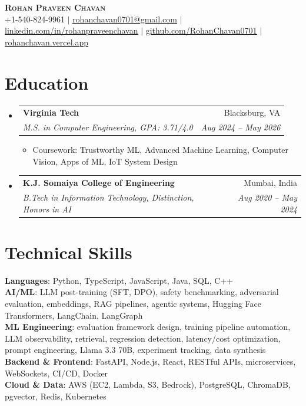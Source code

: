\documentclass[letterpaper,10pt]{article}
\makeatletter
\newcommand{\resumeItem}[1]{\item\small{#1 \vspace{-2.5pt}}}
\newcommand{\resumeSubheading}[4]{
  \vspace{-2pt}\item
    \begin{tabular*}{0.97\textwidth}[t]{l@{\extracolsep{\fill}}r}
      \textbf{#1} & #2 \\
      \textit{\small#3} & \textit{\small #4} \\
    \end{tabular*}\vspace{-7pt}
}
\newcommand{\resumeSubHeadingListStart}{\begin{itemize}[leftmargin=0.15in, label={}]}
\newcommand{\resumeSubHeadingListEnd}{\end{itemize}}
\newcommand{\resumeItemListStart}{\begin{itemize}}
\newcommand{\resumeItemListEnd}{\end{itemize}\vspace{-5pt}}
\makeatother
\begin{document}
\begin{center}
    \textbf{\Huge \scshape Rohan Praveen Chavan} \\ \vspace{2pt}
    \small +1-540-824-9961 $|$
    \href{mailto:rohanchavan0701@gmail.com}{\underline{rohanchavan0701@gmail.com}} $|$
    \href{https://linkedin.com/in/rohanpraveenchavan}{\underline{linkedin.com/in/rohanpraveenchavan}} $|$
    \href{https://github.com/RohanChavan0701}{\underline{github.com/RohanChavan0701}} $|$
    \href{https://rohanchavan.vercel.app}{\underline{rohanchavan.vercel.app}}
\end{center}

\section{Education}
\resumeSubHeadingListStart
    \resumeSubheading
      {Virginia Tech}{Blacksburg, VA}
      {M.S. in Computer Engineering, GPA: 3.71/4.0}{Aug 2024 -- May 2026}
      \resumeItemListStart
        \resumeItem{Coursework: Trustworthy ML, Advanced Machine Learning, Computer Vision, Apps of ML, IoT System Design}
      \resumeItemListEnd
    \resumeSubheading
      {K.J. Somaiya College of Engineering}{Mumbai, India}
      {B.Tech in Information Technology, Distinction, Honors in AI}{Aug 2020 -- May 2024}
\resumeSubHeadingListEnd

\section{Technical Skills}
\begin{itemize}[leftmargin=0.15in, label={}]
    \small{\item{
     \textbf{Languages}{: Python, TypeScript, JavaScript, Java, SQL, C++} \\
     \textbf{AI/ML}{: LLM post-training (SFT, DPO), safety benchmarking, adversarial evaluation, embeddings,
       RAG pipelines, agentic systems, Hugging Face Transformers, LangChain, LangGraph} \\
     \textbf{ML Engineering}{: evaluation framework design, training pipeline automation, LLM observability,
       retrieval, regression detection, latency/cost optimization, prompt engineering,
       Llama 3.3 70B, experiment tracking, data synthesis} \\
     \textbf{Backend \& Frontend}{: FastAPI, Node.js, React, RESTful APIs, microservices,
       WebSockets, CI/CD, Docker} \\
     \textbf{Cloud \& Data}{: AWS (EC2, Lambda, S3, Bedrock), PostgreSQL, ChromaDB, pgvector, Redis, Kubernetes}
    }}
\end{itemize}
\end{document}
